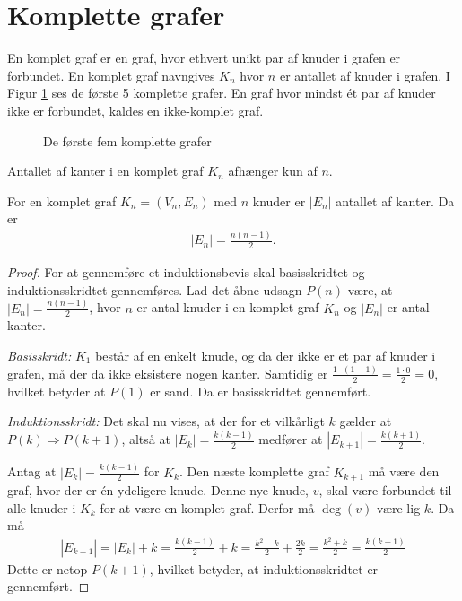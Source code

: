 \section{Komplette grafer}
En komplet graf er en graf, hvor ethvert unikt par af knuder i grafen er forbundet.
En komplet graf navngives $K_n$ hvor $n$ er antallet af knuder i grafen.
I Figur \ref{fig:komplette_grafer} ses de første 5 komplette grafer.
En graf hvor mindst ét par af knuder ikke er forbundet, kaldes en ikke-komplet graf.

\begin{figure}[h]
	\centering
	
	\caption{De første fem komplette grafer} \label{fig:komplette_grafer}
\end{figure}

Antallet af kanter i en komplet graf $K_n$ afhænger kun af $n$.

\begin{thm}
	For en komplet graf $K_n = (V_n, E_n)$ med $n$ knuder er $|E_n|$ antallet af kanter. Da er
	\begin{align*}
		|E_n| = \frac{n (n - 1)}{2}.
	\end{align*}
\end{thm}
\begin{proof}
	For at gennemføre et induktionsbevis skal basisskridtet og induktionsskridtet gennemføres.
	Lad det åbne udsagn $P(n)$ være, at $|E_n|= \frac{n (n - 1)}{2}$, hvor $n$ er antal knuder i en komplet graf $K_n$ og $|E_n|$ er antal kanter. 

	\textit{Basisskridt:} $K_1$ består af en enkelt knude, og da der ikke er et par af knuder i grafen, må der da ikke eksistere nogen kanter.
	Samtidig er $\frac{1 \cdot (1-1)}{2}=\frac{ 1 \cdot 0}{2} = 0$, hvilket betyder at $P(1)$ er sand. Da er basisskridtet gennemført.

	\textit{Induktionsskridt:} Det skal nu vises, at der for et vilkårligt $k$ gælder at $P(k) \Rightarrow P(k + 1)$, altså at $|E_k| = \frac{k (k - 1)}{2}$ medfører at $|E_{k+1}| = \frac{k (k + 1)}{2}$.

	Antag at $|E_k| = \frac{k (k - 1)}{2}$ for $K_k$.
	Den næste komplette graf $K_{k+1}$ må være den graf, hvor der er én ydeligere knude.
	Denne nye knude, $v$, skal være forbundet til alle knuder i $K_k$ for at være en komplet graf. Derfor må $\deg (v)$ være lig $k$. Da må
	\begin{align*}
		|E_{k+1}| 
		= |E_k| + k
		= \frac{k (k - 1)}{2} + k
		= \frac{k^2 - k}{2} + \frac{2k}{2}
		= \frac{k^2 + k}{2} 
		= \frac{k (k + 1)}{2}
	\end{align*}
	Dette er netop $P(k + 1)$, hvilket betyder, at induktionsskridtet er gennemført.
\end{proof}
